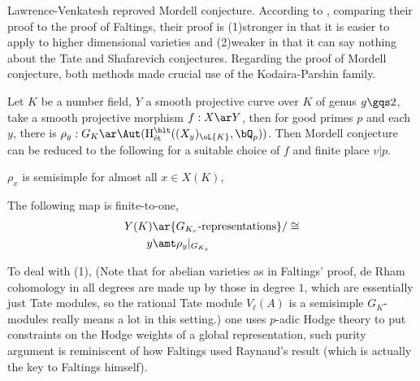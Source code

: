 \documentclass[a4paper, twoside]{article}
\begin{document}
\begin{ups}
	Lawrence-Venkatesh reproved Mordell conjecture. According to \cite[Section~1.5]{LV2020}, comparing their proof to the proof of Faltings, their proof is (1)stronger in that it is easier to apply to higher dimensional varieties and (2)weaker in that it can say nothing about the Tate and Shafarevich conjectures. Regarding the proof of Mordell conjecture, both methods made crucial use of the Kodaira-Parshin family.


	Let $K$ be a number field, $Y$ a smooth projective curve over $K$ of genus $g\gqs2$, take a smooth projective morphism $f:X\ar Y$, then for good primes $p$ and each $y$, there is $\rho_{y}:G_{K}\ar\Aut(\mathrm{H}_{\text{{\'e}t}}^{\blt}((X_{y})_{\oL{K}},\bQ_{p}))$. Then Mordell conjecture can be reduced to the following for a suitable choice of $f$ and finite place $v|p$.
	\begin{enr}
		\item $\rho_{x}$ is semisimple for almost all $x\in X(K)$,
		\item The following map is finite-to-one,
		\begin{align*}
		  Y(K)&\ar \{\text{$G_{K_{v}}$-representations}\}/\cong \\
		  y&\amt \rho_{y}|_{G_{K_{v}}}
		\end{align*}
	\end{enr}

	To deal with (1), (Note that for abelian varieties as in Faltings' proof, de Rham cohomology in all degrees are made up by those in degree $1$, which are essentially just Tate modules, so the rational Tate module $V_{\ell}(A)$ is a semisimple $G_{K}$-modules really means a lot in this setting.) one uses $p$-adic Hodge theory to put constraints on the Hodge weights of a global representation, such purity argument is reminiscent of how Faltings used Raynaud's result (which is actually the key to Faltings himself).


\end{ups}
\end{document}
